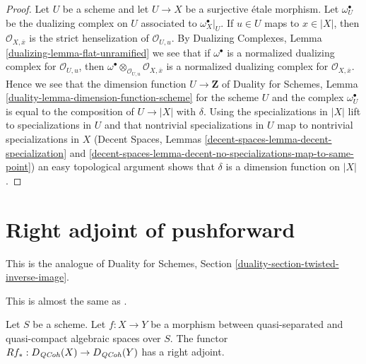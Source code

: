 \begin{proof}
Let $U$ be a scheme and let $U \to X$ be a surjective \'etale morphism.
Let $\omega_U^\bullet$ be the dualizing complex on $U$ associated
to $\omega_X^\bullet|_U$.
If $u \in U$ maps to $x \in |X|$, then $\mathcal{O}_{X, \overline{x}}$
is the strict henselization of $\mathcal{O}_{U, u}$. By
Dualizing Complexes, Lemma \ref{dualizing-lemma-flat-unramified}
we see that if $\omega^\bullet$ is a normalized dualizing complex
for $\mathcal{O}_{U, u}$, then
$\omega^\bullet \otimes_{\mathcal{O}_{U, u}} \mathcal{O}_{X, \overline{x}}$
is a normalized dualizing complex for $\mathcal{O}_{X, \overline{x}}$.
Hence we see that the dimension function $U \to \mathbf{Z}$ of
Duality for Schemes, Lemma \ref{duality-lemma-dimension-function-scheme}
for the scheme $U$ and the complex
$\omega_U^\bullet$ is equal to the composition of $U \to |X|$ with $\delta$.
Using the specializations in $|X|$ lift to specializations in $U$
and that nontrivial specializations in $U$ map to
nontrivial specializations in $X$
(Decent Spaces, Lemmas \ref{decent-spaces-lemma-decent-specialization} and
\ref{decent-spaces-lemma-decent-no-specializations-map-to-same-point})
an easy topological argument shows that $\delta$ is a dimension function
on $|X|$.
\end{proof}






\section{Right adjoint of pushforward}
\label{section-twisted-inverse-image}

\noindent
This is the analogue of Duality for Schemes, Section
\ref{duality-section-twisted-inverse-image}.

\begin{lemma}
\label{lemma-twisted-inverse-image}
\begin{reference}
This is almost the same as \cite[Example 4.2]{Neeman-Grothendieck}.
\end{reference}
Let $S$ be a scheme.
Let $f : X \to Y$ be a morphism between quasi-separated and quasi-compact
algebraic spaces over $S$. The functor $Rf_* : D_{\mathit{QCoh}}(X) \to D_{\mathit{QCoh}}(Y)$
has a right adjoint.
\end{lemma}


